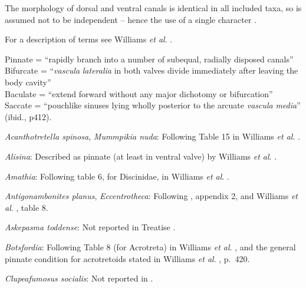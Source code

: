 \documentclass[openany]{book}
\theoremstyle{definition}
\theoremstyle{definition}
\theoremstyle{definition}
\theoremstyle{remark}
\begin{document}
The morphology of dorsal and ventral canals is identical in all included
taxa, so is assumed not to be independent -- hence the use of a single
character \citep[contra][]{Williams2000LinguliformeaCraniiformea}.

For a description of terms see Williams \emph{et al}.
\citeyearpar[2000]{Williams1997Introduction}.

Pinnate = ``rapidly branch into a number of subequal, radially disposed
canals''\\
Bifurcate = ``\emph{vascula} \emph{lateralia} in both valves divide
immediately after leaving the body cavity''\\
Baculate = ``extend forward without any major dichotomy or bifurcation''
\citep[ p.~418]{Williams1997Introduction}\\
Saccate = ``pouchlike sinuses lying wholly posterior to the arcuate
\emph{vascula} \emph{media}'' (ibid., p412).

\hypertarget{Acanthotretella_spinosa-coding-31}{}
\emph{Acanthotretella spinosa}, \emph{Mummpikia nuda}: Following Table
15 in Williams \emph{et al}.
\citeyearpar{Williams2000LinguliformeaCraniiformea}.

\hypertarget{Alisina-coding-31}{}
\emph{Alisina}: Described as pinnate (at least in ventral valve) by
Williams \emph{et al}. \citeyearpar[p.~250]{Williams1998Thediversity}.

\hypertarget{Amathia-coding-31}{}
\emph{Amathia}: Following table 6, for Discinidae, in Williams \emph{et
al}. \citeyearpar{Williams2000LinguliformeaCraniiformea}.

\hypertarget{Antigonambonites_planus-coding-31}{}
\emph{Antigonambonites planus}, \emph{Eccentrotheca}: Following
\citet{Williams1998Thediversity}, appendix 2, and Williams \emph{et al}.
\citeyearpar{Williams2000LinguliformeaCraniiformea}, table 8.

\hypertarget{Askepasma_toddense-coding-31}{}
\emph{Askepasma toddense}: Not reported in Treatise
\citep{Williams2000LinguliformeaCraniiformea}.

\hypertarget{Botsfordia-coding-31}{}
\emph{Botsfordia}: Following Table 8 (for Acrotreta) in Williams
\emph{et al}. \citeyearpar{Williams2000LinguliformeaCraniiformea}, and
the general pinnate condition for acrotretoids stated in Williams
\emph{et al}. \citeyearpar{Williams1997Introduction}, p.~420.

\hypertarget{Clupeafumosus_socialis-coding-31}{}
\emph{Clupeafumosus socialis}: Not reported in
\citet{Williams2000LinguliformeaCraniiformea}.
\end{document}
